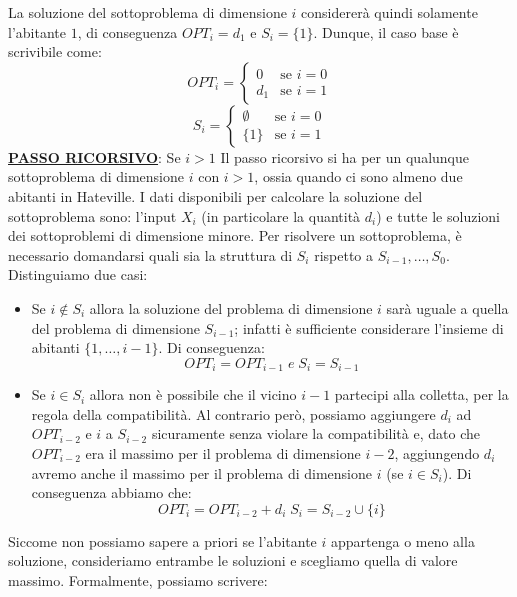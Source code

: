 \documentclass[12pt]{article}
\begin{document}
La soluzione del sottoproblema di dimensione $i$ considererà quindi solamente l'abitante $1$, di conseguenza $OPT_i = d_1$ e $S_i = \{1\}$. Dunque, il caso base è scrivibile come:
\begin{equation*}
    OPT_i = \begin{cases}
        0 & \textrm{se } i = 0 \\
        d_1 & \textrm{se } i = 1
    \end{cases}
\end{equation*}
\begin{equation*}
    S_i = \begin{cases}
        \emptyset & \textrm{se } i = 0 \\
        \{1\} & \textrm{se } i = 1
    \end{cases}
\end{equation*}
\textbf{\underline{PASSO RICORSIVO}}: Se $i > 1$ \newline
Il passo ricorsivo si ha per un qualunque sottoproblema di dimensione $i$ con $i > 1$, ossia quando ci sono almeno due abitanti in Hateville.
I dati disponibili per calcolare la soluzione del sottoproblema sono: l'input $X_i$ (in particolare la quantità $d_i$) e tutte le soluzioni dei sottoproblemi di dimensione minore.
Per risolvere un sottoproblema, è necessario domandarsi quali sia la struttura di $S_i$ rispetto a $S_{i-1}, \dots, S_0$. Distinguiamo due casi:
\begin{itemize}
    \item Se $i \notin S_i$ allora la soluzione del problema di dimensione $i$ sarà uguale a quella del problema di dimensione $S_{i-1}$; infatti è sufficiente considerare l'insieme di abitanti $\{1,\dots, i-1\}$. Di conseguenza:
    $$OPT_i = OPT_{i-1} \; e \; S_i = S_{i-1}$$
    \item Se $i \in S_i$ allora non è possibile che il vicino $i-1$ partecipi alla colletta, per la regola della compatibilità. Al contrario però, possiamo aggiungere $d_i$ ad $OPT_{i-2}$ e $i$ a $S_{i-2}$ sicuramente senza violare la compatibilità e, dato che $OPT_{i-2}$ era il massimo per il problema
    di dimensione $i-2$, aggiungendo $d_i$ avremo anche il massimo per il problema di dimensione $i$ (se $i \in S_i$). Di conseguenza abbiamo che:
    $$OPT_i = OPT_{i-2} + d_i \; S_i = S_{i-2} \cup \{i\}$$
\end{itemize}
Siccome non possiamo sapere a priori se l'abitante $i$ appartenga o meno alla soluzione, consideriamo entrambe le soluzioni e scegliamo quella di valore massimo.
Formalmente, possiamo scrivere:
\end{document}
